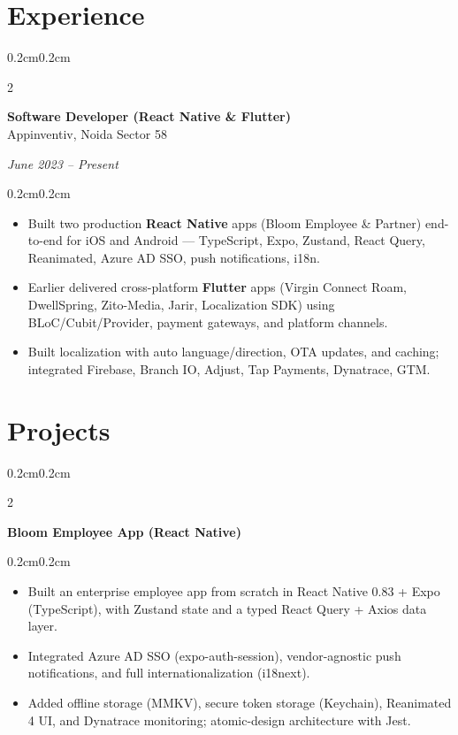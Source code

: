 \documentclass[10pt, letterpaper]{article}
\newenvironment{highlights}{\begin{itemize}[topsep=0.06cm, parsep=0.06cm, partopsep=0pt, itemsep=0pt, leftmargin=0.5cm]}{\end{itemize}}
\newenvironment{onecolentry}{\begin{adjustwidth}{0.2cm}{0.2cm}}{\end{adjustwidth}}
\newenvironment{twocolentry}[2][]{
  \onecolentry
  \def\secondColumn{#2}
  \setcolumnwidth{\fill, 4.5cm}
  \begin{paracol}{2}
}{
  \switchcolumn \raggedleft \secondColumn
  \end{paracol}
  \endonecolentry
}
\begin{document}
\section{Experience}
\begin{twocolentry}{\textit{June 2023 – Present}}
\textbf{Software Developer (React Native \& Flutter)} \\
Appinventiv, Noida Sector 58
\end{twocolentry}
\begin{onecolentry}
    \begin{highlights}
        \item Built two production \textbf{React Native} apps (Bloom Employee \& Partner) end-to-end for iOS and Android — TypeScript, Expo, Zustand, React Query, Reanimated, Azure AD SSO, push notifications, i18n.
        \item Earlier delivered cross-platform \textbf{Flutter} apps (Virgin Connect Roam, DwellSpring, Zito-Media, Jarir, Localization SDK) using BLoC/Cubit/Provider, payment gateways, and platform channels.
        \item Built localization with auto language/direction, OTA updates, and caching; integrated Firebase, Branch IO, Adjust, Tap Payments, Dynatrace, GTM.
    \end{highlights}
\end{onecolentry}


\section{Projects}

\begin{twocolentry}{}
\textbf{Bloom Employee App (React Native)}
\end{twocolentry}
\begin{onecolentry}
\begin{highlights}
    \item Built an enterprise employee app from scratch in React Native 0.83 + Expo (TypeScript), with Zustand state and a typed React Query + Axios data layer.
    \item Integrated Azure AD SSO (expo-auth-session), vendor-agnostic push notifications, and full internationalization (i18next).
    \item Added offline storage (MMKV), secure token storage (Keychain), Reanimated 4 UI, and Dynatrace monitoring; atomic-design architecture with Jest.
\end{highlights}
\end{onecolentry}
\end{document}
